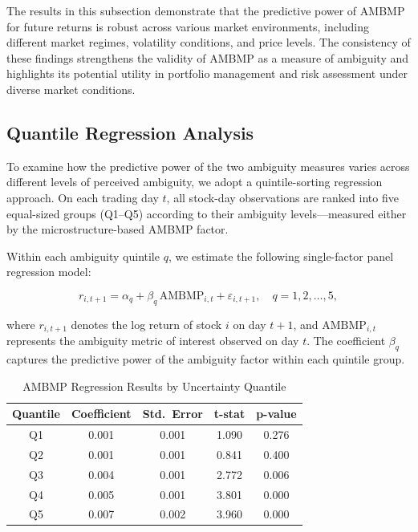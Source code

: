 \documentclass[preprint,12pt,authoryear]{elsarticle}
\begin{document}
The results in this subsection demonstrate that the predictive power of AMBMP for future returns is robust across various market environments, including different market regimes, volatility conditions, and price levels. The consistency of these findings strengthens the validity of AMBMP as a measure of ambiguity and highlights its potential utility in portfolio management and risk assessment under diverse market conditions.





\subsection{ Quantile Regression Analysis}

To examine how the predictive power of the two ambiguity measures varies across different levels of perceived ambiguity, we adopt a quintile-sorting regression approach. On each trading day \( t \), all stock-day observations are ranked into five equal-sized groups (Q1–Q5) according to their ambiguity levels—measured either by the microstructure-based AMBMP factor. 

Within each ambiguity quintile \( q \), we estimate the following single-factor panel regression model:

\begin{equation}
r_{i,t+1} = \alpha_q + \beta_q\,\text{AMBMP}_{i,t} + \varepsilon_{i,t+1}, 
\quad q = 1,2,\ldots,5,    
\end{equation}

where \( r_{i,t+1} \) denotes the log return of stock \( i \) on day \( t+1 \), and \( \text{AMBMP}_{i,t} \) represents the ambiguity metric of interest observed on day \( t \). The coefficient \( \beta_q \) captures the predictive power of the ambiguity factor within each quintile group.

\begin{table}[ht]
\centering
\caption{AMBMP Regression Results by Uncertainty Quantile}
\label{tab:ambmp_results}
\begin{tabular}{ccccc}
\toprule
\textbf{Quantile} & \textbf{Coefficient} & \textbf{Std.\ Error} & \textbf{t-stat} & \textbf{p-value} \\
\midrule
Q1 & 0.001 & 0.001 & 1.090 & 0.276 \\
Q2 & 0.001 & 0.001 & 0.841 & 0.400 \\
Q3 & 0.004 & 0.001 & 2.772 & 0.006 \\
Q4 & 0.005 & 0.001 & 3.801 & 0.000 \\
Q5 & 0.007 & 0.002 & 3.960 & 0.000 \\
\bottomrule
\end{tabular}
\end{table}
\end{document}
